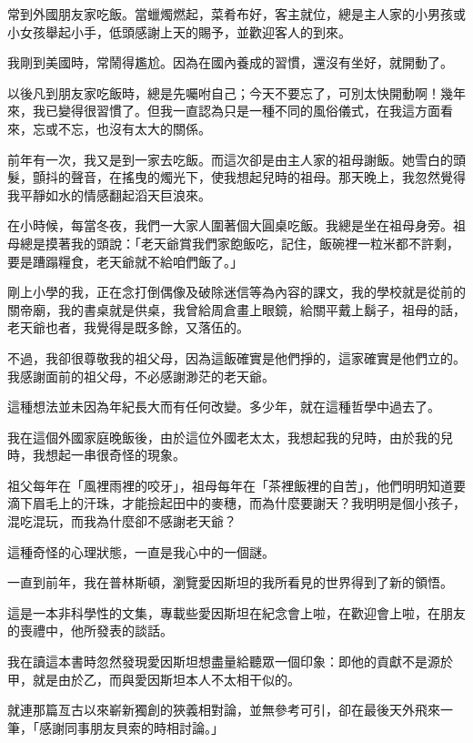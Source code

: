 
\begin{acknowledgement}

\begin{tempsection}
常到外國朋友家吃飯。當蠟燭燃起，菜肴布好，客主就位，總是主人家的小男孩或小女孩舉起小手，低頭感謝上天的賜予，並歡迎客人的到來。

我剛到美國時，常鬧得尷尬。因為在國內養成的習慣，還沒有坐好，就開動了。

以後凡到朋友家吃飯時，總是先囑咐自己；今天不要忘了，可別太快開動啊！幾年來，我已變得很習慣了。但我一直認為只是一種不同的風俗儀式，在我這方面看來，忘或不忘，也沒有太大的關係。

前年有一次，我又是到一家去吃飯。而這次卻是由主人家的祖母謝飯。她雪白的頭髮，顫抖的聲音，在搖曳的燭光下，使我想起兒時的祖母。那天晚上，我忽然覺得我平靜如水的情感翻起滔天巨浪來。

在小時候，每當冬夜，我們一大家人圍著個大圓桌吃飯。我總是坐在祖母身旁。祖母總是摸著我的頭說：「老天爺賞我們家飽飯吃，記住，飯碗裡一粒米都不許剩，要是蹧蹋糧食，老天爺就不給咱們飯了。」

剛上小學的我，正在念打倒偶像及破除迷信等為內容的課文，我的學校就是從前的關帝廟，我的書桌就是供桌，我曾給周倉畫上眼鏡，給關平戴上鬍子，祖母的話，老天爺也者，我覺得是既多餘，又落伍的。

不過，我卻很尊敬我的祖父母，因為這飯確實是他們掙的，這家確實是他們立的。我感謝面前的祖父母，不必感謝渺茫的老天爺。

這種想法並未因為年紀長大而有任何改變。多少年，就在這種哲學中過去了。

我在這個外國家庭晚飯後，由於這位外國老太太，我想起我的兒時，由於我的兒時，我想起一串很奇怪的現象。

祖父每年在「風裡雨裡的咬牙」，祖母每年在「茶裡飯裡的自苦」，他們明明知道要滴下眉毛上的汗珠，才能撿起田中的麥穗，而為什麼要謝天？我明明是個小孩子，混吃混玩，而我為什麼卻不感謝老天爺？

這種奇怪的心理狀態，一直是我心中的一個謎。

一直到前年，我在普林斯頓，瀏覽愛因斯坦的我所看見的世界得到了新的領悟。

這是一本非科學性的文集，專載些愛因斯坦在紀念會上啦，在歡迎會上啦，在朋友的喪禮中，他所發表的談話。

我在讀這本書時忽然發現愛因斯坦想盡量給聽眾一個印象：即他的貢獻不是源於甲，就是由於乙，而與愛因斯坦本人不太相干似的。

就連那篇亙古以來嶄新獨創的狹義相對論，並無參考可引，卻在最後天外飛來一筆，「感謝同事朋友貝索的時相討論。」


\end{tempsection}
\end{acknowledgement}
